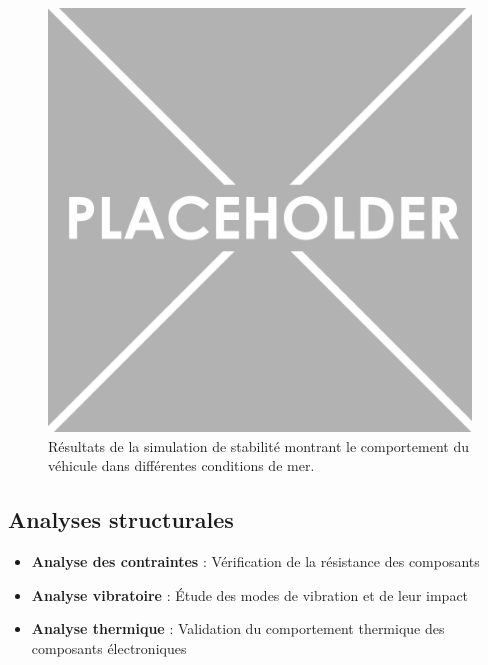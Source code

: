 {\begin{figure}[!htpb]
    \centering
    \includegraphics[width=0.8\linewidth]{Figures/PezizaTuberosa.jpg}
    \caption[Simulation de stabilité]{Résultats de la simulation de stabilité montrant le comportement du véhicule dans différentes conditions de mer.}
    \label{fig:simulation-stabilite}
\end{figure}

\subsection{Analyses structurales}
\begin{itemize}
    \setlength{\itemsep}{.375em}
    \item \textbf{Analyse des contraintes} : Vérification de la résistance des composants
    \item \textbf{Analyse vibratoire} : Étude des modes de vibration et de leur impact
    \item \textbf{Analyse thermique} : Validation du comportement thermique des composants électroniques
\end{itemize}

}

